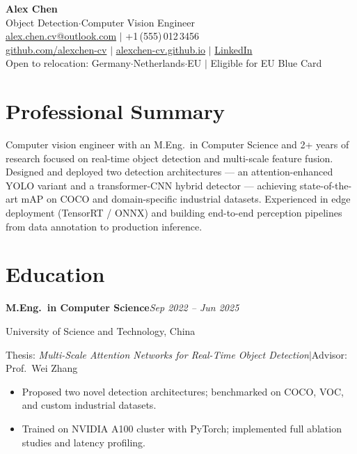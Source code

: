 \documentclass[11pt,a4paper]{article}
\newcommand{\cventry}[3]{%
    \textbf{#1}\hfill\textit{#2}\par\vspace{2pt}%
    #3\par\vspace{7pt}%
}
\begin{document}
\pagestyle{empty}
\color{darktext}

\begin{center}
    {\LARGE\bfseries Alex Chen}\\[7pt]
    {\large\color{subtext} Object Detection\enspace$\cdot$\enspace Computer Vision Engineer}\\[9pt]
    {\small
        \faEnvelope\enspace \href{mailto:alex.chen.cv@outlook.com}{alex.chen.cv@outlook.com}
        \enspace$|$\enspace
        \faPhone\enspace +1\,(555)\,012\,3456
    }\\[3pt]
    {\small
        \faGithub\enspace \href{https://github.com/alexchen-cv}{github.com/alexchen-cv}
        \enspace$|$\enspace
        \faGlobe\enspace \href{https://alexchen-cv.github.io/}{alexchen-cv.github.io}
        \enspace$|$\enspace
        \faLinkedin\enspace \href{https://linkedin.com/in/alexchen-cv}{LinkedIn}
    }\\[3pt]
    {\small\color{subtext}
        Open to relocation: Germany\enspace$\cdot$\enspace Netherlands\enspace$\cdot$\enspace EU
        \enspace$|$\enspace
        Eligible for EU Blue Card
    }
\end{center}
\vspace{2pt}

\section{Professional Summary}

Computer vision engineer with an M.Eng.\ in Computer Science and 2+ years of research focused on real-time object detection and multi-scale feature fusion. Designed and deployed two detection architectures --- an attention-enhanced YOLO variant and a transformer-CNN hybrid detector --- achieving state-of-the-art mAP on COCO and domain-specific industrial datasets. Experienced in edge deployment (TensorRT / ONNX) and building end-to-end perception pipelines from data annotation to production inference.

\section{Education}

\cventry{M.Eng.\ in Computer Science}{Sep 2022 -- Jun 2025}{%
    University of Science and Technology, China\par\vspace{1pt}
    Thesis: \textit{Multi-Scale Attention Networks for Real-Time Object Detection}\enspace$|$\enspace Advisor: Prof.\ Wei Zhang
    \begin{itemize}[leftmargin=14pt, nosep, topsep=3pt, itemsep=1pt]
        \item Proposed two novel detection architectures; benchmarked on COCO, VOC, and custom industrial datasets.
        \item Trained on NVIDIA A100 cluster with PyTorch; implemented full ablation studies and latency profiling.
    \end{itemize}
}
\end{document}
